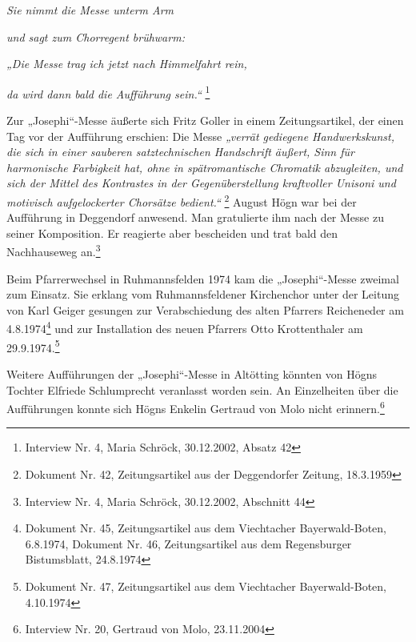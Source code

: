 \documentclass[a4paper]{article}
\newcommand\textstyleZitate[1]{\textit{#1}}
\begin{document}
\textstyleZitate{Sie nimmt die Messe unterm Arm}

\textstyleZitate{und sagt zum Chorregent brühwarm:}

\textstyleZitate{„Die Messe trag ich jetzt nach Himmelfahrt rein,}

\textstyleZitate{da wird dann bald die Aufführung sein.“ }\footnote{
Interview Nr. 4, Maria Schröck, 30.12.2002, Absatz 42}

Zur „Josephi“-Messe äußerte sich Fritz Goller in einem Zeitungsartikel,
der einen Tag vor der Aufführung erschien:\textstyleZitate{ }Die
Messe\textstyleZitate{ „verrät gediegene Handwerkskunst, die sich in
einer sauberen satztechnischen Handschrift äußert, Sinn für harmonische
Farbigkeit hat, ohne in spätromantische Chromatik abzugleiten, und sich
der Mittel des Kontrastes in der Gegenüberstellung kraftvoller Unisoni
und motivisch aufgelockerter Chorsätze bedient.“ }\footnote{ Dokument
Nr. 42, Zeitungsartikel aus der Deggendorfer Zeitung, 18.3.1959} August
Högn war bei der Aufführung in Deggendorf anwesend. Man gratulierte ihm
nach der Messe zu seiner Komposition. Er reagierte aber bescheiden und
trat bald den Nachhauseweg an.\footnote{ Interview Nr. 4, Maria
Schröck, 30.12.2002, Abschnitt 44}

Beim Pfarrerwechsel in Ruhmannsfelden 1974 kam die „Josephi“-Messe
zweimal zum Einsatz. Sie erklang vom Ruhmannsfeldener Kirchenchor unter
der Leitung von Karl Geiger gesungen zur Verabschiedung des alten
Pfarrers Reicheneder am 4.8.1974\footnote{ Dokument Nr. 45,
Zeitungsartikel aus dem Viechtacher Bayerwald-Boten, 6.8.1974, Dokument
Nr. 46, Zeitungsartikel aus dem Regensburger Bistumsblatt, 24.8.1974}
und zur Installation des neuen Pfarrers Otto Krottenthaler am
29.9.1974.\footnote{ Dokument Nr. 47, Zeitungsartikel aus dem
Viechtacher Bayerwald-Boten, 4.10.1974}

Weitere Aufführungen der „Josephi“-Messe in Altötting könnten von Högns
Tochter Elfriede Schlumprecht veranlasst worden sein. An Einzelheiten
über die Aufführungen konnte sich Högns Enkelin Gertraud von Molo nicht
erinnern.\footnote{ Interview Nr. 20, Gertraud von Molo, 23.11.2004}
\end{document}
